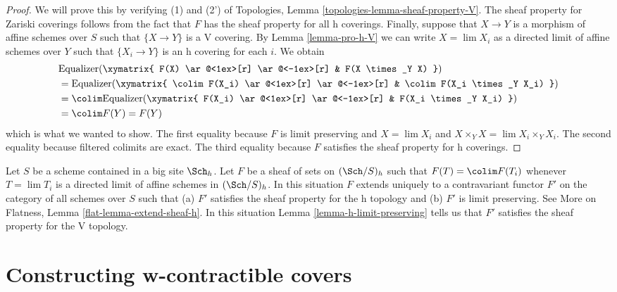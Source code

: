 \begin{proof}
We will prove this by verifying (1) and (2') of
Topologies, Lemma \ref{topologies-lemma-sheaf-property-V}.
The sheaf property for Zariski coverings follows from
the fact that $F$ has the sheaf property for all h coverings.
Finally, suppose that $X \to Y$ is a morphism of affine schemes
over $S$ such that $\{X \to Y\}$ is a V covering.
By Lemma \ref{lemma-pro-h-V} we can write $X = \lim X_i$
as a directed limit of affine schemes
over $Y$ such that $\{X_i \to Y\}$ is an h covering for each $i$.
We obtain
\begin{align*}
&
\text{Equalizer}(
\xymatrix{
F(X) \ar@<1ex>[r] \ar@<-1ex>[r] &
F(X \times_Y X)
}
)
\\
& =
\text{Equalizer}(
\xymatrix{
\colim F(X_i) \ar@<1ex>[r] \ar@<-1ex>[r] &
\colim F(X_i \times_Y X_i)
}
)
\\
& =
\colim
\text{Equalizer}(
\xymatrix{
F(X_i) \ar@<1ex>[r] \ar@<-1ex>[r] &
F(X_i \times_Y X_i)
}
)
\\
& =
\colim F(Y) = F(Y)
\end{align*}
which is what we wanted to show.
The first equality because $F$ is limit preserving and $X = \lim X_i$ and
$X \times_Y X = \lim X_i \times_Y X_i$.
The second equality because filtered colimits are exact.
The third equality because $F$ satisfies the sheaf property
for h coverings.
\end{proof}

\begin{remark}
\label{remark-h-limit-preserving}
Let $S$ be a scheme contained in a big site $\Sch_h$. Let $F$ be a sheaf
of sets on $(\Sch/S)_h$ such that $F(T) = \colim F(T_i)$ whenever
$T = \lim T_i$ is a directed limit of affine schemes in $(\Sch/S)_h$.
In this situation $F$ extends uniquely to a contravariant functor $F'$
on the category of all schemes over $S$ such that (a) $F'$ satisfies the
sheaf property for the h topology and (b) $F'$ is limit preserving.
See More on Flatness, Lemma \ref{flat-lemma-extend-sheaf-h}.
In this situation Lemma \ref{lemma-h-limit-preserving}
tells us that $F'$ satisfies
the sheaf property for the V topology.
\end{remark}







\section{Constructing w-contractible covers}
\label{section-w-contractible}

